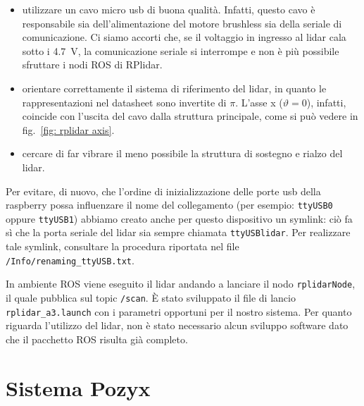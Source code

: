 \begin{itemize}
	\item utilizzare un cavo micro usb di buona qualità. Infatti, questo cavo è responsabile sia dell'alimentazione del motore brushless sia della seriale di 
	comunicazione. Ci siamo accorti che, se il voltaggio in ingresso al lidar cala sotto i \SI{4.7}{\volt}, la comunicazione seriale si interrompe e non è più possibile 
	sfruttare i nodi ROS di RPlidar.

	\item orientare correttamente il sistema di riferimento del lidar, in quanto le rappresentazioni nel datasheet sono invertite di $\pi$. 
	L'asse x ($\vartheta = 0$), infatti, coincide con l'uscita del cavo dalla struttura principale, come si può vedere in fig.~\ref{fig: rplidar axis}.

	\item cercare di far vibrare il meno possibile la struttura di sostegno e rialzo del lidar.

\end{itemize}

Per evitare, di nuovo, che l'ordine di inizializzazione delle porte usb della raspberry possa influenzare il nome del collegamento (per esempio: 
\texttt{ttyUSB0} oppure \texttt{ttyUSB1}) abbiamo creato anche per questo dispositivo un symlink: ciò fa sì che la porta seriale del lidar sia sempre chiamata \texttt{ttyUSBlidar}. 
Per realizzare tale symlink, consultare la procedura riportata nel file \texttt{/Info/renaming\_ttyUSB.txt}.

In ambiente ROS viene eseguito il lidar andando a lanciare il nodo \texttt{rplidarNode}, il quale pubblica sul topic \texttt{/scan}. 
\`E stato sviluppato il file di lancio \texttt{rplidar\_a3.launch} con i parametri opportuni per il nostro sistema.  
Per quanto riguarda l'utilizzo del lidar, non è stato necessario alcun sviluppo software dato che il pacchetto ROS risulta già completo.


\newpage
\section{Sistema Pozyx}
\label{sez:Sistema Pozyx}

